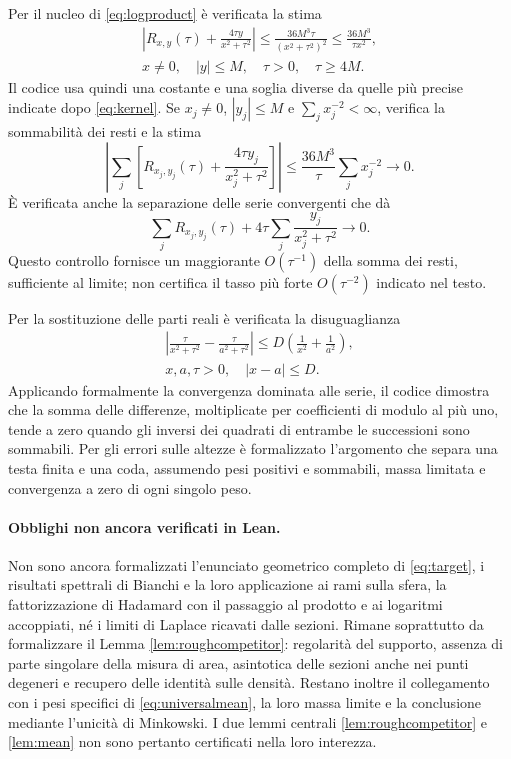 \documentclass[11pt,a4paper]{article}
\theoremstyle{remark}
\begin{document}
Per il nucleo di \eqref{eq:logproduct} è verificata la stima
\[
\begin{gathered}
\left|R_{x,y}(\tau)+\frac{4\tau y}{x^2+\tau^2}\right|
\leq\frac{36M^3\tau}{(x^2+\tau^2)^2}
\leq\frac{36M^3}{\tau x^2},\\
x\ne0,\quad |y|\leq M,\quad \tau>0,\quad \tau\geq4M.
\end{gathered}
\]
Il codice usa quindi una costante e una soglia diverse da quelle
più precise indicate dopo \eqref{eq:kernel}. Se $x_j\ne0$,
$|y_j|\leq M$ e $\sum_jx_j^{-2}<\infty$, verifica la sommabilità
dei resti e la stima
\[
\left|\sum_j\left[R_{x_j,y_j}(\tau)
              +\frac{4\tau y_j}{x_j^2+\tau^2}\right]\right|
\leq\frac{36M^3}{\tau}\sum_jx_j^{-2}\longrightarrow0.
\]
È verificata anche la separazione delle serie convergenti che dà
\[
\sum_jR_{x_j,y_j}(\tau)
+4\tau\sum_j\frac{y_j}{x_j^2+\tau^2}\longrightarrow0.
\]
Questo controllo fornisce un maggiorante $O(\tau^{-1})$ della
somma dei resti, sufficiente al limite; non certifica il tasso
più forte $O(\tau^{-2})$ indicato nel testo.

Per la sostituzione delle parti reali è verificata la disuguaglianza
\[
\begin{gathered}
\left|\frac{\tau}{x^2+\tau^2}
       -\frac{\tau}{a^2+\tau^2}\right|
\leq D\left(\frac1{x^2}+\frac1{a^2}\right),\\
x,a,\tau>0,\quad |x-a|\leq D.
\end{gathered}
\]
Applicando formalmente la convergenza dominata alle serie, il
codice dimostra che la somma delle differenze, moltiplicate per
coefficienti di modulo al più uno, tende a zero quando gli
inversi dei quadrati di entrambe le successioni sono sommabili.
Per gli errori sulle altezze è formalizzato l'argomento che
separa una testa finita e una coda, assumendo pesi positivi e
sommabili, massa limitata e convergenza a zero di ogni singolo peso.

\paragraph{Obblighi non ancora verificati in Lean.}
Non sono ancora formalizzati l'enunciato geometrico completo
di \eqref{eq:target}, i risultati spettrali di Bianchi e la loro
applicazione ai rami sulla sfera, la fattorizzazione di Hadamard
con il passaggio al prodotto e ai logaritmi accoppiati, né i
limiti di Laplace ricavati dalle sezioni. Rimane soprattutto da
formalizzare il Lemma \ref{lem:roughcompetitor}: regolarità del
supporto, assenza di parte singolare della misura di area,
asintotica delle sezioni anche nei punti degeneri e recupero
delle identità sulle densità. Restano inoltre il collegamento
con i pesi specifici di \eqref{eq:universalmean}, la loro massa
limite e la conclusione mediante l'unicità di Minkowski.
I due lemmi centrali \ref{lem:roughcompetitor} e \ref{lem:mean}
non sono pertanto certificati nella loro interezza.
\end{document}
